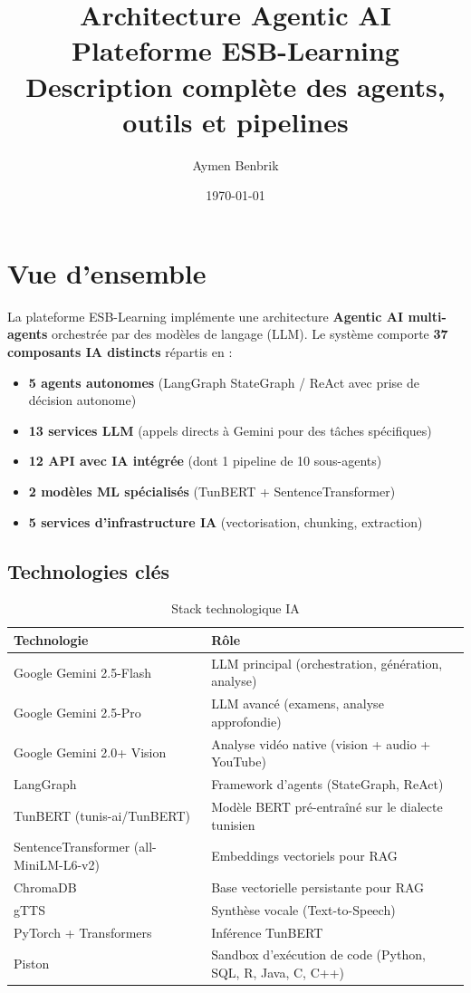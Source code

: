 \documentclass[12pt,a4paper]{article}
\title{\textbf{Architecture Agentic AI}\\[0.5em]
\large Plateforme ESB-Learning\\[0.3em]
\normalsize Description complète des agents, outils et pipelines}
\author{Aymen Benbrik}
\date{\today}
\begin{document}
\maketitle
\tableofcontents
\newpage

\section{Vue d'ensemble}

La plateforme ESB-Learning implémente une architecture \textbf{Agentic AI multi-agents} orchestrée par des modèles de langage (LLM). Le système comporte \textbf{37 composants IA distincts} répartis en :

\begin{itemize}[leftmargin=*]
    \item \textbf{5 agents autonomes} (LangGraph StateGraph / ReAct avec prise de décision autonome)
    \item \textbf{13 services LLM} (appels directs à Gemini pour des tâches spécifiques)
    \item \textbf{12 API avec IA intégrée} (dont 1 pipeline de 10 sous-agents)
    \item \textbf{2 modèles ML spécialisés} (TunBERT + SentenceTransformer)
    \item \textbf{5 services d'infrastructure IA} (vectorisation, chunking, extraction)
\end{itemize}

\subsection{Technologies clés}

\begin{table}[h!]
\centering
\begin{tabular}{@{}ll@{}}
\toprule
\textbf{Technologie} & \textbf{Rôle} \\
\midrule
Google Gemini 2.5-Flash & LLM principal (orchestration, génération, analyse) \\
Google Gemini 2.5-Pro & LLM avancé (examens, analyse approfondie) \\
Google Gemini 2.0+ Vision & Analyse vidéo native (vision + audio + YouTube) \\
LangGraph & Framework d'agents (StateGraph, ReAct) \\
TunBERT (tunis-ai/TunBERT) & Modèle BERT pré-entraîné sur le dialecte tunisien \\
SentenceTransformer (all-MiniLM-L6-v2) & Embeddings vectoriels pour RAG \\
ChromaDB & Base vectorielle persistante pour RAG \\
gTTS & Synthèse vocale (Text-to-Speech) \\
PyTorch + Transformers & Inférence TunBERT \\
Piston & Sandbox d'exécution de code (Python, SQL, R, Java, C, C++) \\
\bottomrule
\end{tabular}
\caption{Stack technologique IA}
\end{table}
\end{document}
